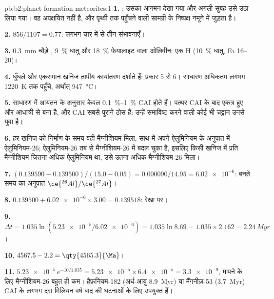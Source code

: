 \begin{solution}{pb:b2:planet-formation-meteorites:1}
\textbf{1.} : उसका आगमन देखा गया और अगली सुबह उसे उठा लिया गया।
वह अपक्षयित नहीं है, और पृथ्वी तक पहुँचने वाली सामग्री के निष्पक्ष नमूने में जुड़ता है।

\textbf{2.} $856/1107 = 0.77$: लगभग चार में से तीन संभावनाएँ।

\textbf{3.} \qty{0.3}{mm} चौड़े , \qty{9}{\percent} धातु और
\qty{18}{\percent} फ़ेयालाइट वाला ओलिवीन: एक H  (\qty{10}{\percent} धातु, Fa 16--20)।

\textbf{4.} धुँधले  और एकसमान खनिज तापीय कायांतरण दर्शाते हैं: प्रकार
5 से 6। साधारण  अधिकतम लगभग \qty{1220}{K} तक पहुँचे, अर्थात्
\qty{947}{\degreeCelsius}।

\textbf{5.} साधारण  में आयतन के अनुसार केवल \qtyrange{0.1}{1}{\percent} CAI
होते हैं। पत्थर CAI के बाद एकत्र हुए  और आधात्री से बना है, और CAI
सबसे पुराने ठोस हैं: उन्हें समाविष्ट करने वाली कोई भी चट्टान उनसे युवा है।

\textbf{6.} हर खनिज को निर्माण के समय वही मैग्नीशियम मिला, साथ में अपने ऐलुमिनियम
के अनुपात में ऐलुमिनियम-26; ऐलुमिनियम-26 तब से
मैग्नीशियम-26 में बदल चुका है, इसलिए किसी खनिज में प्रति मैग्नीशियम जितना अधिक ऐलुमिनियम था,
उसे उतना अधिक मैग्नीशियम-26 मिला।

\textbf{7.} $(0.139590 - 0.139500)/(15.0 - 0.05) = \num{0.000090}/14.95 =
\num{6.02e-6}$: बनते समय  का अनुपात
$\ce{^{26}Al}/\ce{^{27}Al}$।

\textbf{8.} $0.139500 + \num{6.02e-6}\times3.00 = 0.139518$: रेखा पर।

\textbf{9.} $\Delta t = 1.035\ln(\num{5.23e-5}/\num{6.02e-6}) = 1.035\ln8.69 =
1.035\times2.162 = \qty{2.24}{Myr}$।

\textbf{10.} $4567.5 - 2.2 = \qty{4565.3}{\Ma}$।

\textbf{11.} $\num{5.23e-5}\,e^{-10/1.035} = \num{5.23e-5}\times\num{6.4e-5} =
\num{3.3e-9}$, मापने के लिए मैग्नीशियम-26 बहुत ही कम। हैफ़नियम-182 (अर्ध-आयु
\qty{8.9}{Myr}) या मैंगनीज़-53 (\qty{3.7}{Myr}) CAI के लगभग दस मिलियन वर्ष बाद की घटनाओं के
लिए उपयुक्त हैं।


\end{solution}
